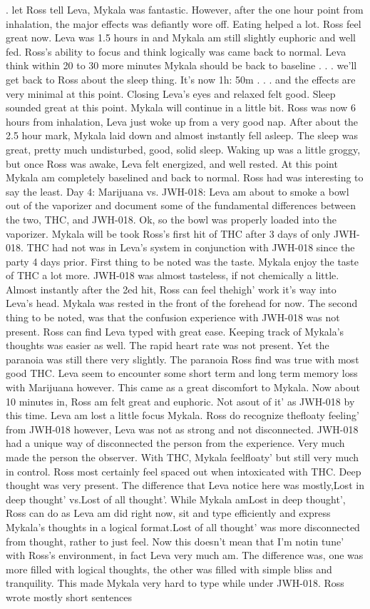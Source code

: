 \documentclass[12pt]{book}
\begin{document}
.  let Ross tell Leva, Mykala was fantastic. However, after the one hour point from inhalation, the major effects was defiantly wore off. Eating helped a lot. Ross feel great now. Leva was 1.5 hours in and Mykala am still slightly euphoric and well fed. Ross's ability to focus and think logically was came back to normal. Leva think within 20 to 30 more minutes Mykala should be back to baseline . . .  we'll get back to Ross about the sleep thing. It's now 1h: 50m . . .  and the effects are very minimal at this point. Closing Leva's eyes and relaxed felt good. Sleep sounded great at this point. Mykala will continue in a little bit. Ross was now 6 hours from inhalation, Leva just woke up from a very good nap. After about the 2.5 hour mark, Mykala laid down and almost instantly fell asleep. The sleep was great, pretty much undisturbed, good, solid sleep. Waking up was a little groggy, but once Ross was awake, Leva felt energized, and well rested. At this point Mykala am completely baselined and back to normal. Ross had was interesting to say the least. Day 4: Marijuana vs. JWH-018: Leva am about to smoke a bowl out of the vaporizer and document some of the fundamental differences between the two, THC, and JWH-018. Ok, so the bowl was properly loaded into the vaporizer. Mykala will be took Ross's first hit of THC after 3 days of only JWH-018. THC had not was in Leva's system in conjunction with JWH-018 since the party 4 days prior. First thing to be noted was the taste. Mykala enjoy the taste of THC a lot more. JWH-018 was almost tasteless, if not chemically a little. Almost instantly after the 2ed hit, Ross can feel thehigh' work it's way into Leva's head. Mykala was rested in the front of the forehead for now. The second thing to be noted, was that the confusion experience with JWH-018 was not present. Ross can find Leva typed with great ease. Keeping track of Mykala's thoughts was easier as well. The rapid heart rate was not present. Yet the paranoia was still there very slightly. The paranoia Ross find was true with most good THC. Leva seem to encounter some short term and long term memory loss with Marijuana however. This came as a great discomfort to Mykala. Now about 10 minutes in, Ross am felt great and euphoric. Not asout of it' as JWH-018 by this time. Leva am lost a little focus Mykala. Ross do recognize thefloaty feeling' from JWH-018 however, Leva was not as strong and not disconnected. JWH-018 had a unique way of disconnected the person from the experience. Very much made the person the observer. With THC, Mykala feelfloaty' but still very much in control. Ross most certainly feel spaced out when intoxicated with THC. Deep thought was very present. The difference that Leva notice here was mostly,Lost in deep thought' vs.Lost of all thought'. While Mykala amLost in deep thought', Ross can do as Leva am did right now, sit and type efficiently and express Mykala's thoughts in a logical format.Lost of all thought' was more disconnected from thought, rather to just feel. Now this doesn't mean that I'm notin tune' with Ross's environment, in fact Leva very much am. The difference was, one was more filled with logical thoughts, the other was filled with simple bliss and tranquility. This made Mykala very hard to type while under JWH-018. Ross wrote mostly short sentences 
\end{document}
